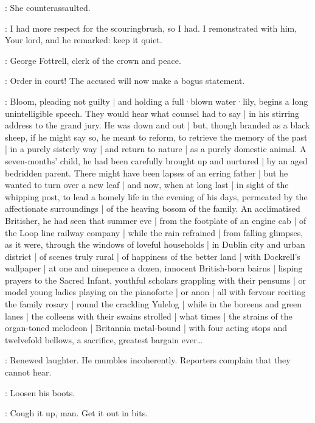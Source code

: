 \Bloom:
She counterassaulted.

\Driscoll:
I had more respect for the scouringbrush,
so I had.
I remonstrated with him,
Your lord,
and he remarked:
keep it quiet.


:
George Fottrell,
clerk of the crown and peace.

\Fottrell:
Order in court!
The accused will now make a bogus statement.

:
Bloom,
pleading not guilty |
and holding a full·blown water·lily,
begins a long unintelligible speech.
They would hear what counsel had to say |
in his stirring address to the grand jury.
He was down and out |
but,
though branded as a black sheep,
if he might say so,
he meant to reform,
to retrieve the memory of the past |
in a purely sisterly way |
and return to nature |
as a purely domestic animal.
A seven-months' child,
he had been carefully brought up and nurtured |
by an aged bedridden parent.
There might have been lapses of an erring father |
but he wanted to turn over a new leaf |
and now,
when at long last |
in sight of the whipping post,
to lead a homely life in the evening of his days,
permeated by the affectionate surroundings |
of the heaving bosom of the family.
An acclimatised Britisher,
he had seen
that summer eve |
from the footplate of an engine cab |
of the Loop line railway company |
while the rain refrained |
from falling glimpses,
as it were,
through the windows of loveful households |
in Dublin city and urban district |
of scenes truly rural |
of happiness of the better land |
with Dockrell's wallpaper |
at one and ninepence a dozen,
innocent British-born bairns |
lisping prayers to the Sacred Infant,
youthful scholars grappling with their pensums |
or model young ladies playing on the pianoforte |
or anon |
all with fervour reciting the family rosary |
round the crackling Yulelog |
while in the boreens and green lanes |
the colleens with their swains strolled |
what times |
the strains of the organ-toned melodeon |
Britannia metal-bound |
with four acting stops and twelvefold bellows,
a sacrifice,
greatest bargain ever\ldots

:
Renewed laughter.
He mumbles incoherently.
Reporters complain that they cannot hear.

\LongShortHand:
Loosen his boots.

\MacHugh:
Cough it up,
man.
Get it out in bits.

